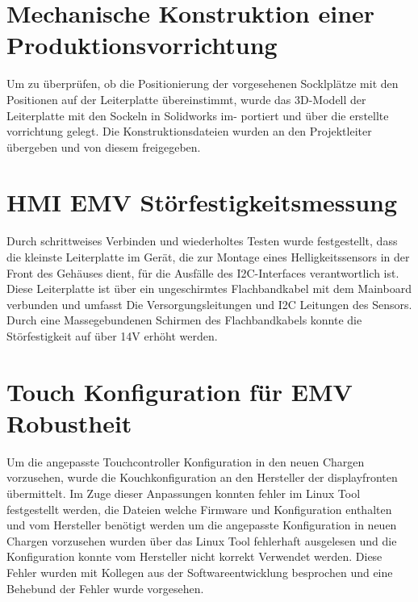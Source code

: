 \documentclass[praktikum,german]{hgbthesis}
\begin{document}
\section{Mechanische Konstruktion einer Produktionsvorrichtung}
Um zu überprüfen, ob die Positionierung der vorgesehenen Socklplätze mit den Positionen auf der Leiterplatte übereinstimmt, wurde das 3D-Modell der Leiterplatte mit den Sockeln in Solidworks im-
portiert und über die erstellte vorrichtung gelegt. Die Konstruktionsdateien wurden an den Projektleiter übergeben und von diesem freigegeben.

\section{HMI EMV Störfestigkeitsmessung}
Durch schrittweises Verbinden und wiederholtes Testen wurde festgestellt, dass die kleinste Leiterplatte im Gerät, die zur Montage eines Helligkeitssensors in der Front des Gehäuses dient, für die Ausfälle des I2C-Interfaces verantwortlich ist. Diese Leiterplatte ist über ein ungeschirmtes Flachbandkabel mit dem Mainboard verbunden und umfasst Die Versorgungsleitungen und I2C Leitungen des Sensors. Durch eine Massegebundenen Schirmen des Flachbandkabels konnte die Störfestigkeit auf über 14V erhöht werden.

\section{Touch Konfiguration für EMV Robustheit}
Um die angepasste Touchcontroller Konfiguration in den neuen Chargen vorzusehen, wurde die Kouchkonfiguration an den Hersteller der displayfronten übermittelt.
Im Zuge dieser Anpassungen konnten fehler im Linux Tool festgestellt werden, die Dateien welche Firmware und Konfiguration enthalten und vom Hersteller benötigt werden um die angepasste Konfiguration in neuen Chargen vorzusehen wurden über das Linux Tool fehlerhaft ausgelesen und die Konfiguration konnte vom Hersteller nicht korrekt Verwendet werden. Diese Fehler wurden mit Kollegen aus der Softwareentwicklung besprochen und eine Behebund der Fehler wurde vorgesehen.



\end{document}
